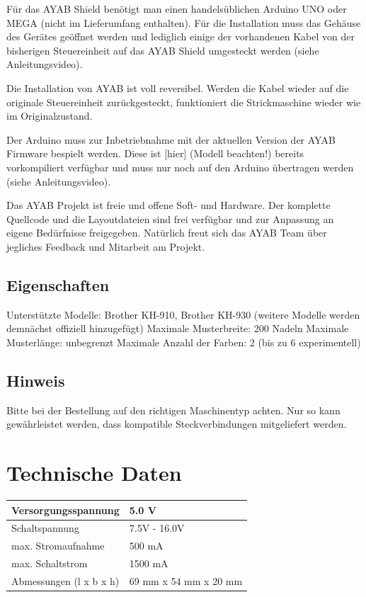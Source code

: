 \documentclass[fleqn,10pt]{SelfArx} %
\begin{document}
Für das AYAB Shield benötigt man einen handelsüblichen Arduino UNO oder MEGA (nicht im Lieferumfang enthalten). Für die Installation muss das Gehäuse des Gerätes geöffnet werden und lediglich einige der vorhandenen Kabel von der bisherigen Steuereinheit auf das AYAB Shield umgesteckt werden (siehe Anleitungsvideo).

Die Installation von AYAB ist voll reversibel. Werden die Kabel wieder auf die originale Steuereinheit zurückgesteckt, funktioniert die Strickmaschine wieder wie im Originalzustand.

Der Arduino muss zur Inbetriebnahme mit der aktuellen Version der AYAB Firmware bespielt werden. Diese ist [hier] (Modell beachten!) bereits vorkompiliert verfügbar und muss nur noch auf den Arduino übertragen werden (siehe Anleitungsvideo).

Das AYAB Projekt ist freie und offene Soft- und Hardware. Der komplette Quellcode und die Layoutdateien sind frei verfügbar und zur Anpassung an eigene Bedürfnisse freigegeben. Natürlich freut sich das AYAB Team über jegliches Feedback und Mitarbeit am Projekt.

 \subsection*{Eigenschaften}

Unterstützte Modelle: Brother KH-910, Brother KH-930 (weitere Modelle werden demnächst offiziell hinzugefügt)
Maximale Musterbreite: 200 Nadeln
Maximale Musterlänge: unbegrenzt
Maximale Anzahl der Farben: 2 (bis zu 6 experimentell)

 \subsection*{Hinweis}

Bitte bei der Bestellung auf den richtigen Maschinentyp achten. Nur so kann gewährleistet werden, dass kompatible Steckverbindungen mitgeliefert werden.


\section{Technische Daten}

\begin{tabular}{ll}
Versorgungsspannung       & 5.0 V              \\ \hline
Schaltspannung            & 7.5V - 16.0V       \\ \hline
max. Stromaufnahme        & 500 mA             \\ \hline
max. Schaltstrom          & 1500 mA            \\ \hline
Abmessungen (l x b x h)   & 69 mm x 54 mm x 20 mm
\end{tabular}
\end{document}
